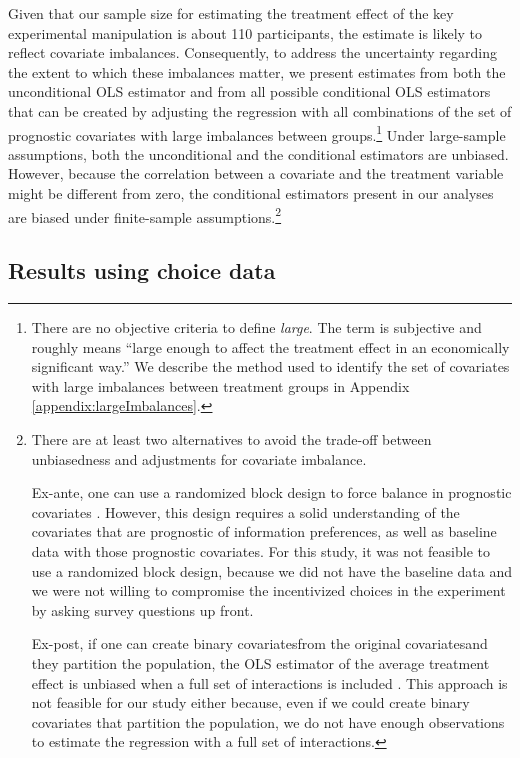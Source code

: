 Given that our sample size for estimating the treatment effect of the key experimental manipulation is about 110 participants, the estimate is likely to reflect covariate imbalances. Consequently, to address the uncertainty regarding the extent to which these imbalances matter, we present estimates from both the unconditional OLS estimator and from all possible conditional OLS estimators that can be created by adjusting the regression with all combinations of the set of prognostic covariates with large imbalances between groups.\footnote{There are no objective criteria to define \emph{large}. The term is subjective and roughly means \enquote{large enough to affect the treatment effect in an economically significant way.} We describe the method used to identify the set of covariates with large imbalances between treatment groups in Appendix \ref{appendix:largeImbalances}.} Under large-sample assumptions, both the unconditional and the conditional estimators are unbiased. However, because the correlation between a covariate and the treatment variable might be different from zero, the conditional estimators present in our analyses are biased under finite-sample assumptions.\footnote{There are at least two alternatives to avoid the trade-off between unbiasedness and adjustments for covariate imbalance.

Ex-ante, one can use a randomized block design to force balance in prognostic covariates \citet{atheyChapterEconometricsRandomized2017}. However, this design requires a solid understanding of the covariates that are prognostic of information preferences, as well as baseline data with those prognostic covariates. For this study, it was not feasible to use a randomized block design, because we did not have the baseline data and we were not willing to compromise the incentivized choices in the experiment by asking survey questions up front.

Ex-post, if one can create binary covariates\textemdash from the original covariates\textemdash and they partition the population, the OLS estimator of the average treatment effect is unbiased when a full set of interactions is included \citep{linAgnosticNotesRegression2013,atheyChapterEconometricsRandomized2017}. This approach is not feasible for our study either because, even if we could create binary covariates that partition the population, we do not have enough observations to estimate the regression with a full set of interactions.
}

\subsection{Results using choice data}

